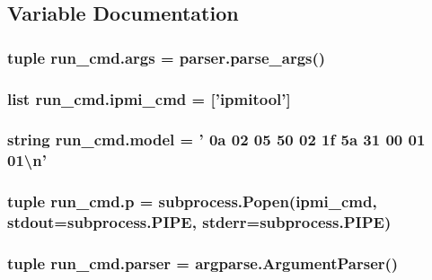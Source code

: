 \subsection{Variable Documentation}
\hypertarget{namespacerun__cmd_ab32fce8f4b23146962d803fba46f8823}{
\subsubsection[{args}]{\setlength{\rightskip}{0pt plus 5cm}tuple run\-\_\-cmd.\-args = parser.\-parse\-\_\-args()}}\label{namespacerun__cmd_ab32fce8f4b23146962d803fba46f8823}
\hypertarget{namespacerun__cmd_a867790f9a65754b460f8ddd598f77aef}{
\subsubsection[{ipmi\-\_\-cmd}]{\setlength{\rightskip}{0pt plus 5cm}list run\-\_\-cmd.\-ipmi\-\_\-cmd = \mbox{[}'ipmitool'\mbox{]}}}\label{namespacerun__cmd_a867790f9a65754b460f8ddd598f77aef}
\hypertarget{namespacerun__cmd_a7669928154f8fad34ec31bccfbcbc114}{
\subsubsection[{model}]{\setlength{\rightskip}{0pt plus 5cm}string run\-\_\-cmd.\-model = ' 0a 02 05 50 02 1f 5a 31 00 01 01\textbackslash{}n'}}\label{namespacerun__cmd_a7669928154f8fad34ec31bccfbcbc114}
\hypertarget{namespacerun__cmd_a91a2d7f07be05bed4155bf0d9f0e12ed}{
\subsubsection[{p}]{\setlength{\rightskip}{0pt plus 5cm}tuple run\-\_\-cmd.\-p = subprocess.\-Popen({\bf ipmi\-\_\-cmd}, stdout=subprocess.\-P\-I\-P\-E, stderr=subprocess.\-P\-I\-P\-E)}}\label{namespacerun__cmd_a91a2d7f07be05bed4155bf0d9f0e12ed}
\hypertarget{namespacerun__cmd_a4881756a760a58750fd91ab12871f48f}{
\subsubsection[{parser}]{\setlength{\rightskip}{0pt plus 5cm}tuple run\-\_\-cmd.\-parser = argparse.\-Argument\-Parser()}}\label{namespacerun__cmd_a4881756a760a58750fd91ab12871f48f}
